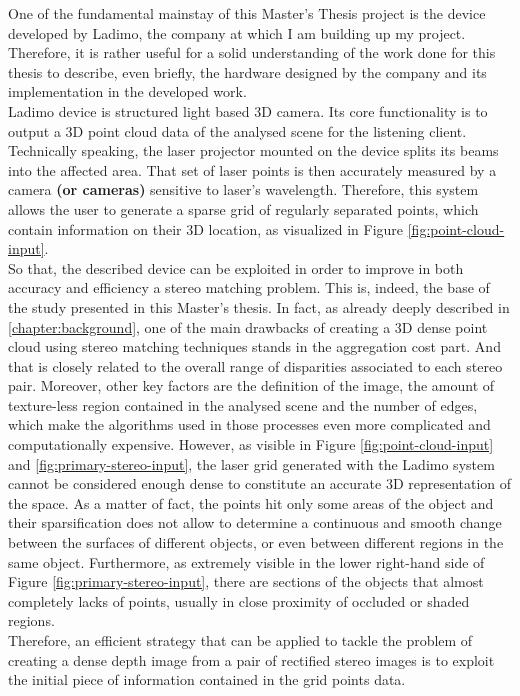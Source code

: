 One of the fundamental mainstay of this Master's Thesis project is the device developed by Ladimo, the company at which I am building up my project. 
Therefore, it is rather useful for a solid understanding of the work done for this thesis to describe, even briefly, the hardware designed by the company and its implementation in the developed work. \\
Ladimo device is structured light based 3D camera. 
Its core functionality is to output a 3D point cloud data of the analysed scene for the listening client. 
Technically speaking, the laser projector mounted on the device splits its beams into the affected area.
That set of laser points is then accurately measured by a camera \textbf{(or cameras)} sensitive to laser's wavelength.
Therefore, this system allows the user to generate a sparse grid of regularly separated points, which contain information on their 3D location, as visualized in Figure \ref{fig:point-cloud-input}. \\
So that, the described device can be exploited in order to improve in both accuracy and efficiency a stereo matching problem.
This is, indeed, the base of the study presented in this Master's thesis. 
In fact, as already deeply described in \ref{chapter:background}, one of the main drawbacks of creating a 3D dense point cloud using stereo matching techniques stands in the aggregation cost part. 
And that is closely related to the overall range of disparities associated to each stereo pair. 
Moreover, other key factors are the definition of the image, the amount of texture-less region contained in the analysed scene and the number of edges, which make the algorithms used in those processes even more complicated and computationally expensive. 
However, as visible in Figure \ref{fig:point-cloud-input} and \ref{fig:primary-stereo-input}, the laser grid generated with the Ladimo system cannot be considered enough dense to constitute an accurate 3D representation of the space. 
As a matter of fact, the points hit only some areas of the object and their sparsification does not allow to determine a continuous and smooth change between the surfaces of different objects, or even between different regions in the same object.
Furthermore, as extremely visible in the lower right-hand side of Figure \ref{fig:primary-stereo-input}, there are sections of the objects that almost completely lacks of points, usually in close proximity of occluded or shaded regions.\\
Therefore, an efficient strategy that can be applied to tackle the problem of creating a dense depth image from a pair of rectified stereo images is to exploit the initial piece of information contained in the grid points data. 

